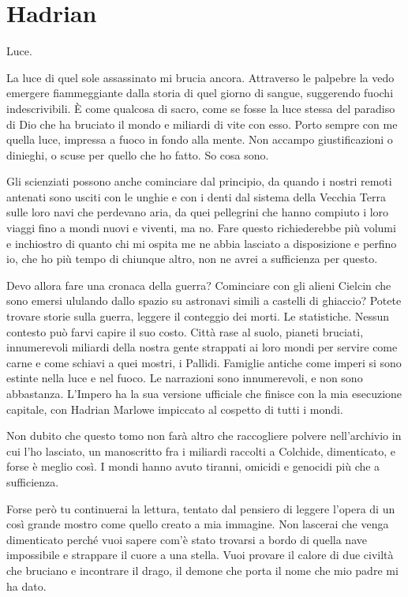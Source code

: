 \mainmatter

\chapter{Hadrian}

Luce.

La luce di quel sole assassinato mi brucia ancora. Attraverso le
palpebre la vedo emergere fiammeggiante dalla storia di quel giorno di
sangue, suggerendo fuochi indescrivibili. È come qualcosa di sacro, come
se fosse la luce stessa del paradiso di Dio che ha bruciato il mondo e
miliardi di vite con esso. Porto sempre con me quella luce, impressa a
fuoco in fondo alla mente. Non accampo giustificazioni o dinieghi, o
scuse per quello che ho fatto. So cosa sono.

Gli scienziati possono anche cominciare dal principio, da quando i
nostri remoti antenati sono usciti con le unghie e con i denti dal
sistema della Vecchia Terra sulle loro navi che perdevano aria, da quei
pellegrini che hanno compiuto i loro viaggi fino a mondi nuovi e
viventi, ma no. Fare questo richiederebbe più volumi e inchiostro di
quanto chi mi ospita me ne abbia lasciato a disposizione e perfino io,
che ho più tempo di chiunque altro, non ne avrei a sufficienza per
questo.

Devo allora fare una cronaca della guerra? Cominciare con gli alieni
Cielcin che sono emersi ululando dallo spazio su astronavi simili a
castelli di ghiaccio? Potete trovare storie sulla guerra, leggere il
conteggio dei morti. Le statistiche. Nessun contesto può farvi capire il
suo costo. Città rase al suolo, pianeti bruciati, innumerevoli miliardi
della nostra gente strappati ai loro mondi per servire come carne e come
schiavi a quei mostri, i Pallidi. Famiglie antiche come imperi si sono
estinte nella luce e nel fuoco. Le narrazioni sono {innumerevoli}, e non
sono abbastanza. L'Impero ha la sua versione ufficiale che finisce con
la mia esecuzione capitale, con Hadrian Marlowe impiccato al cospetto di
tutti i mondi.

Non dubito che questo tomo non farà altro che raccogliere polvere
nell'archivio in cui l'ho lasciato, un manoscritto fra i miliardi
raccolti a Colchide, dimenticato, e forse è meglio così. I mondi hanno
avuto tiranni, omicidi e genocidi più che a sufficienza.

Forse però tu continuerai la lettura, tentato dal pensiero di leggere
l'opera di un così grande mostro come quello creato a mia immagine. Non
lascerai che venga dimenticato perché vuoi sapere com'è stato trovarsi a
bordo di quella nave impossibile e strappare il cuore a una stella. Vuoi
provare il calore di due civiltà che bruciano e incontrare il drago, il
demone che porta il nome che mio padre mi ha dato.

